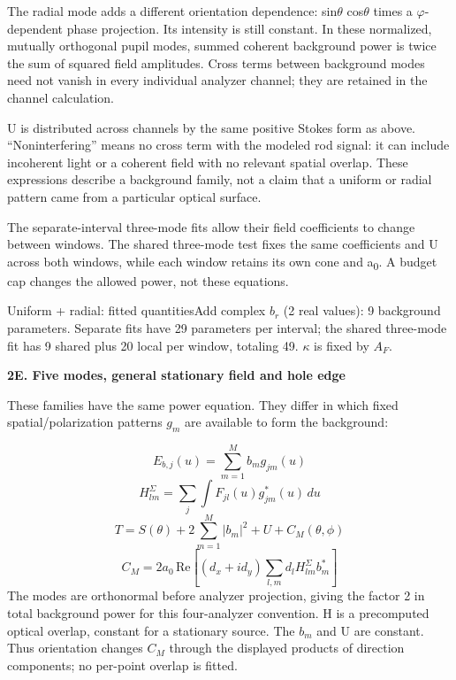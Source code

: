 \documentclass[10pt,a4paper]{article}
\newcommand{\heading}[1]{{\sffamily\Large\bfseries\color{ink}#1}\par\vspace{7pt}}
\begin{document}
The radial mode adds a different orientation dependence: sin\(θ\) cos\(θ\) times a \(φ\)-dependent phase projection. Its intensity is still constant. In these normalized, mutually orthogonal pupil modes, summed coherent background power is twice the sum of squared field amplitudes. Cross terms between background modes need not vanish in every individual analyzer channel; they are retained in the channel calculation.\par
U is distributed across channels by the same positive Stokes form as above. “Noninterfering” means no cross term with the modeled rod signal: it can include incoherent light or a coherent field with no relevant spatial overlap. These expressions describe a background family, not a claim that a uniform or radial pattern came from a particular optical surface.\par
The separate-interval three-mode fits allow their field coefficients to change between windows. The shared three-mode test fixes the same coefficients and U across both windows, while each window retains its own cone and a\textsubscript{0}. A budget cap changes the allowed power, not these equations.\par
\begin{fitbox}{Uniform + radial: fitted quantities}Add complex \(b_{r}\) (2 real values): 9 background parameters. Separate fits have 29 parameters per interval; the shared three-mode fit has 9 shared plus 20 local per window, totaling 49. \(κ\) is fixed by \(A_{F}\).\end{fitbox}
\clearpage
\heading{2E. Five modes, general stationary field and hole edge}
These families have the same power equation. They differ in which fixed spatial/polarization patterns \(g_{m}\) are available to form the background:\par
\begin{equation*}E_{b,j}(u)=\sum_{m=1}^{M}b_m g_{jm}(u)\end{equation*}
\begin{equation*}H^{\Sigma}_{lm}=\sum_j\int F_{jl}(u)g_{jm}^*(u)\,du\end{equation*}
\begin{equation*}T=S(\theta)+2\sum_{m=1}^{M}|b_m|^2+U+C_M(\theta,\phi)\end{equation*}
\begin{equation*}C_M=2a_0\,\mathrm{Re}\!\left[(d_x+i d_y)\sum_{l,m}d_l H^{\Sigma}_{lm}b_m^*\right]\end{equation*}
The modes are orthonormal before analyzer projection, giving the factor 2 in total background power for this four-analyzer convention. H is a precomputed optical overlap, constant for a stationary source. The \(b_{m}\) and U are constant. Thus orientation changes \(C_{M}\) through the displayed products of direction components; no per-point overlap is fitted.\par
\end{document}
